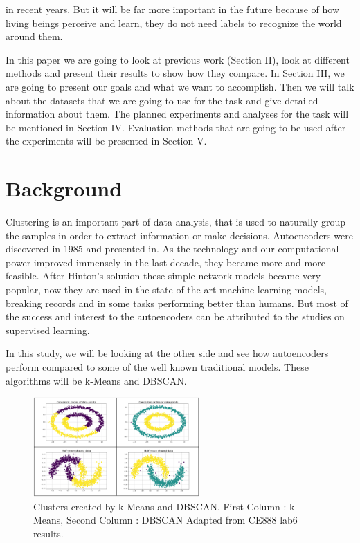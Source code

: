 \documentclass[journal]{IEEEtran}
\begin{document}
in recent years. But it will be far more important in the future because of how living beings perceive and learn, they do not
need labels to recognize the world around them.\par In this paper we are going to look at previous work (Section II),
look at different methods and present their results to show how they compare. In Section III, we are going to present 
our goals and what we want to accomplish. Then we will talk about the datasets that we are going to use for the task and 
give detailed information about them. The planned experiments and analyses for the task will be mentioned in Section IV.
Evaluation methods that are going to be used after the experiments will be presented in Section V.

\section{Background}
Clustering is an important part of data analysis, that is used to naturally group the samples in order to extract information or make decisions\cite{jain1999data}.
Autoencoders were discovered in 1985 and presented in\cite{rumelhart1985learning}. As the technology and our computational power improved immensely in the last decade, they became more and more feasible. After Hinton's solution\cite{hinton2006fast} these simple network models became very popular, now they are used in the state of the art machine learning models, breaking records and in some tasks performing better than humans\cite{schmidhuber2015deep}. But most of the success and interest to the autoencoders can be attributed to the studies on supervised learning.\par
In this study, we will be looking at the other side and see how autoencoders perform compared to some of the well known traditional models. These algorithms will be k-Means\cite{macqueen1967some} and DBSCAN\cite{ester1996density}.

\begin{figure}[!ht]
  \centering
  \includegraphics[width=2.5in]{images/kM_DBSCAN.png}
  \caption{Clusters created by k-Means and DBSCAN.
  First Column : k-Means, Second Column : DBSCAN \newline
  Adapted from CE888 lab6 results.
  }
  \label{fig_cluster}
  \end{figure}
\end{document}
